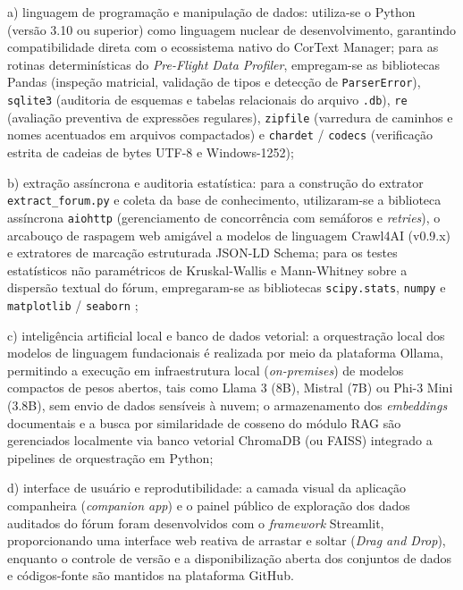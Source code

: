 \documentclass[
	oneside,
	a4paper,
	12pt,
	chapter=TITLE,
	section=TITLE,
	english,
	brazilian
]{abntex2}
\begin{document}
\par\indent a) linguagem de programação e manipulação de dados: utiliza-se o Python (versão 3.10 ou superior) como linguagem nuclear de desenvolvimento, garantindo compatibilidade direta com o ecossistema nativo do CorText Manager; para as rotinas determinísticas do \textit{Pre-Flight Data Profiler}, empregam-se as bibliotecas Pandas (inspeção matricial, validação de tipos e detecção de \texttt{ParserError}), \texttt{sqlite3} (auditoria de esquemas e tabelas relacionais do arquivo \texttt{.db}), \texttt{re} (avaliação preventiva de expressões regulares), \texttt{zipfile} (varredura de caminhos e nomes acentuados em arquivos compactados) e \texttt{chardet} / \texttt{codecs} (verificação estrita de cadeias de bytes UTF-8 e Windows-1252);
\par\indent b) extração assíncrona e auditoria estatística: para a construção do extrator \texttt{extract\_\allowbreak forum.\allowbreak py} e coleta da base de conhecimento, utilizaram-se a biblioteca assíncrona \texttt{aiohttp} (gerenciamento de concorrência com semáforos e \textit{retries}), o arcabouço de raspagem web amigável a modelos de linguagem Crawl4AI (v0.9.x) \cite{Crawl4AI2026} e extratores de marcação estruturada JSON-LD Schema; para os testes estatísticos não paramétricos de Kruskal-Wallis e Mann-Whitney sobre a dispersão textual do fórum, empregaram-se as bibliotecas \texttt{scipy.\allowbreak stats}, \texttt{numpy} e \texttt{matplotlib} / \texttt{seaborn} \cite{Kruskal1952,Mann1947};
\par\indent c) inteligência artificial local e banco de dados vetorial: a orquestração local dos modelos de linguagem fundacionais é realizada por meio da plataforma Ollama, permitindo a execução em infraestrutura local (\textit{on-premises}) de modelos compactos de pesos abertos, tais como Llama 3 (8B), Mistral (7B) ou Phi-3 Mini (3.8B), sem envio de dados sensíveis à nuvem; o armazenamento dos \textit{embeddings} documentais e a busca por similaridade de cosseno do módulo RAG são gerenciados localmente via banco vetorial ChromaDB (ou FAISS) integrado a pipelines de orquestração em Python;
\par\indent d) interface de usuário e reprodutibilidade: a camada visual da aplicação companheira (\textit{companion app}) e o painel público de exploração dos dados auditados do fórum foram desenvolvidos com o \textit{framework} Streamlit, proporcionando uma interface web reativa de arrastar e soltar (\textit{Drag and Drop}), enquanto o controle de versão e a disponibilização aberta dos conjuntos de dados e códigos-fonte são mantidos na plataforma GitHub.
\end{document}

